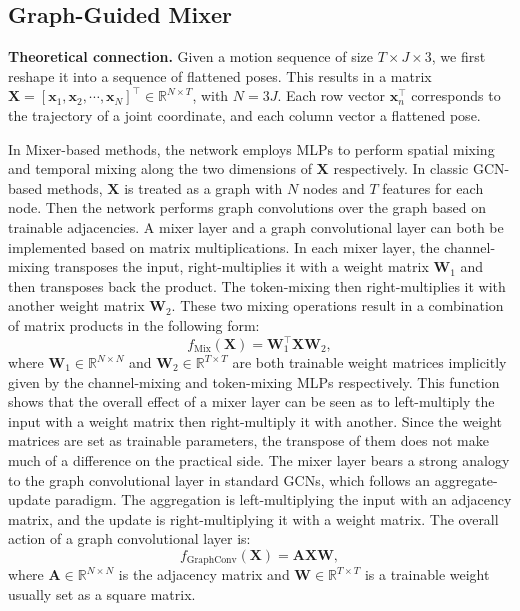 \documentclass[10pt,twocolumn,letterpaper]{article}
\begin{document}
\subsection{Graph-Guided Mixer}\label{our method}

\noindent\textbf{Theoretical connection.}
Given a motion sequence of size $T\times J\times 3$, we first reshape it into a sequence of flattened poses.
This results in a matrix $\mathbf{X} = \left[ \mathbf{x}_1,\mathbf{x}_2,\cdots,\mathbf{x}_N \right] ^\top \in\mathbb{R}^{N\times T}$, with $N=3J$. Each row vector $\mathbf{x}_{n}^\top$ corresponds to the trajectory of a joint coordinate, and each column vector a flattened pose.

In Mixer-based methods, the network employs MLPs to perform spatial mixing and temporal mixing along the two dimensions of $\mathbf{X}$ respectively.
In classic GCN-based methods, $\mathbf{X}$ is treated as a graph with $N$ nodes and $T$ features for each node. Then the network performs graph convolutions over the graph based on trainable adjacencies.
A mixer layer and a graph convolutional layer can both be implemented based on matrix multiplications.
In each mixer layer, the channel-mixing transposes the input, right-multiplies it with a weight matrix $\mathbf{W}_1$ and then transposes back the product.
The token-mixing then right-multiplies it with another weight matrix $\mathbf{W}_2$.
These two mixing operations result in a combination of matrix products in the following form:
\begin{equation}\label{mixer}
    f_\text{Mix} (\mathbf{X}) = \mathbf{W}_1^\top\mathbf{X}\mathbf{W}_2,
\end{equation}
where $\mathbf{W}_1\in\mathbb{R}^{N\times N}$ and $\mathbf{W}_2\in\mathbb{R}^{T\times T}$ are both trainable weight matrices implicitly given by the channel-mixing and token-mixing MLPs respectively.
This function shows that the overall effect of a mixer layer can be seen as to left-multiply the input with a weight matrix then right-multiply it with another.
Since the weight matrices are set as trainable parameters, the transpose of them does not make much of a difference on the practical side.
The mixer layer bears a strong analogy to the graph convolutional layer in standard GCNs, which follows an aggregate-update paradigm.
The aggregation is left-multiplying the input with an adjacency matrix, and the update is right-multiplying it with a weight matrix. The overall action of a graph convolutional layer is:
\begin{equation}\label{graph conv}
    f_\text{GraphConv} (\mathbf{X}) = \mathbf{A}\mathbf{X}\mathbf{W},
\end{equation}
where $\mathbf{A}\in\mathbb{R}^{N\times N}$ is the adjacency matrix and $\mathbf{W}\in\mathbb{R}^{T\times T}$ is a trainable weight usually set as a square matrix.
\end{document}
